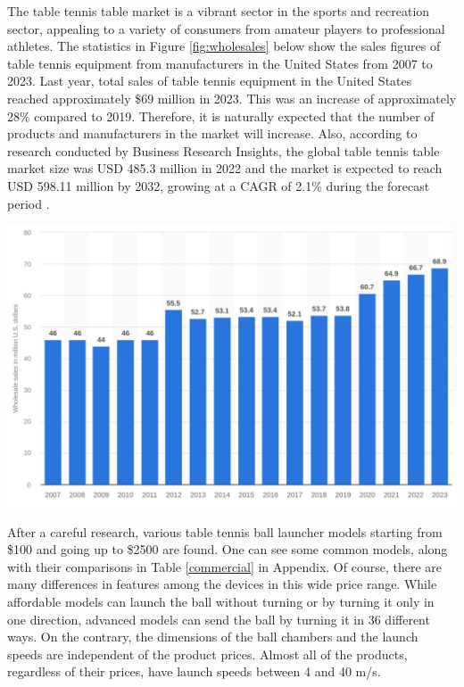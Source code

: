 \documentclass[12pt]{article}
\begin{document}
\begin{minipage}{0.6\textwidth}
    The table tennis table market is a vibrant sector in the sports and recreation sector, appealing to a variety of consumers from amateur players to professional athletes. The statistics in Figure \ref{fig:wholesales} below show the sales figures of table tennis equipment from manufacturers in the United States from 2007 to 2023. Last year, total sales of table tennis equipment in the United States reached approximately \$69 million in 2023. This was an increase of approximately 28\% compared to 2019. Therefore, it is naturally expected that the number of products and manufacturers in the market will increase. Also, according to research conducted by Business Research Insights, the global table tennis table market size was USD 485.3 million in 2022 and the market is expected to reach USD 598.11 million by 2032, growing at a CAGR of 2.1\% during the forecast period \cite{table_tennis_market_2032}.
\end{minipage}
\begin{minipage}{0.38\textwidth}
    \centering
    \includegraphics[width=\textwidth]{figures/wholesales.png}
    \label{fig:wholesales}
\end{minipage}



After a careful research, various table tennis ball launcher models starting from \$100 and going up to \$2500 are found. One can see some common models, along with their comparisons in Table \ref{commercial} in Appendix. Of course, there are many differences in features among the devices in this wide price range. While affordable models can launch the ball without turning or by turning it only in one direction, advanced models can send the ball by turning it in 36 different ways. On the contrary, the dimensions of the ball chambers and the launch speeds are independent of the product prices. Almost all of the products, regardless of their prices, have launch speeds between 4 and 40 m/s. \\
\end{document}
